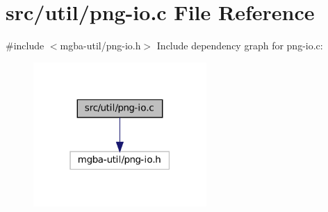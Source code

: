 \hypertarget{png-io_8c}{}\section{src/util/png-\/io.c File Reference}
\label{png-io_8c}
{\ttfamily \#include $<$mgba-\/util/png-\/io.\+h$>$}\newline
Include dependency graph for png-\/io.c\+:
\nopagebreak
\begin{figure}[H]
\begin{center}
\leavevmode
\includegraphics[width=187pt]{png-io_8c__incl}
\end{center}
\end{figure}

